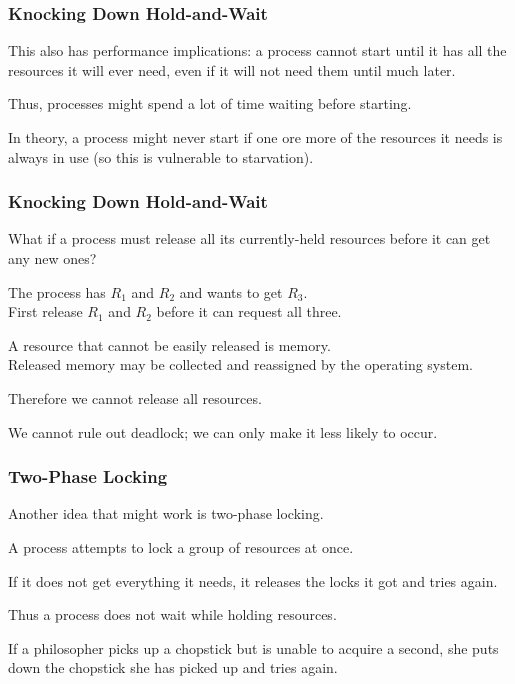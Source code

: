 \begin{frame}
\frametitle{Knocking Down Hold-and-Wait}

This also has performance implications: a process cannot start until it has all the resources it will ever need, even if it will not need them until much later. 

Thus, processes might spend a lot of time waiting before starting.

In theory, a process might never start if one ore more of the resources it needs is always in use (so this is vulnerable to starvation).


\end{frame}

\begin{frame}
\frametitle{Knocking Down Hold-and-Wait}

What if a process must release all its currently-held resources before it can get any new ones? 

The process has $R_{1}$ and $R_{2}$ and wants to get $R_{3}$.\\
\quad First release $R_{1}$ and $R_{2}$ before it can request all three. 

A resource that cannot be easily released is memory.\\
\quad Released memory may be collected and reassigned by the operating system. 

Therefore we cannot release all resources.

We cannot rule out deadlock; we can only make it less likely to occur.

\end{frame}

\begin{frame}
\frametitle{Two-Phase Locking}

Another idea that might work is \alert{two-phase locking}. 

A process attempts to lock a group of resources at once. 

If it does not get everything it needs, it releases the locks it got and tries again. 

Thus a process does not wait while holding resources. 

If a philosopher picks up a chopstick but is unable to acquire a second, she puts down the chopstick she has picked up and tries again.

\end{frame}

